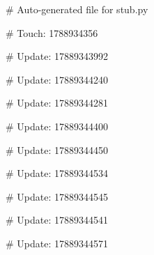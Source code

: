 # Auto-generated file for stub.py

# Touch: 1788934356

# Update: 17889343992

# Update: 17889344240

# Update: 17889344281

# Update: 17889344400

# Update: 17889344450

# Update: 17889344534

# Update: 17889344545

# Update: 17889344541

# Update: 17889344571
